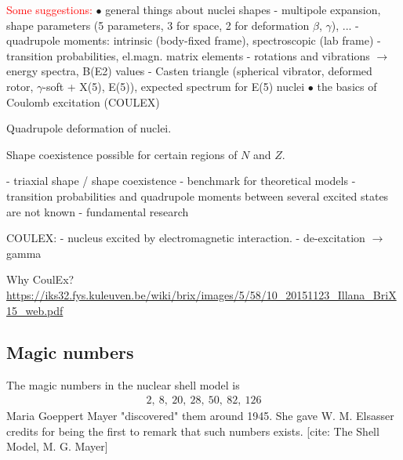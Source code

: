 \documentclass[twoside,english]{uiofysmaster/uiofysmaster}
\newcommand{\ga}{$\gamma$}
\begin{document}
\textcolor{red}{Some suggestions:} \newline
$\bullet$ general things about nuclei shapes \newline
- multipole expansion, shape parameters (5 parameters, 3 for space, 2 for deformation $\beta$, \ga), ... \newline
- quadrupole moments: intrinsic (body-fixed frame), spectroscopic (lab frame)  \newline
- transition probabilities, el.magn. matrix elements  \newline
- rotations and vibrations $\rightarrow$ energy spectra, B(E2) values  \newline
- Casten triangle (spherical vibrator, deformed rotor, \ga-soft + X(5), E(5)), expected spectrum for E(5) nuclei \newline
$\bullet$ the basics of Coulomb excitation (COULEX)

Quadrupole deformation of nuclei. \newline

Shape coexistence possible for certain regions of $N$ and $Z$.

\bigskip

- triaxial shape / shape coexistence \newline
- benchmark for theoretical models \newline
- transition probabilities and quadrupole moments between several excited states are not known \newline
- fundamental research

\bigskip

COULEX: \newline
- nucleus excited by electromagnetic interaction. \newline
- de-excitation $\rightarrow$ gamma

\bigskip

Why CoulEx? \url{https://iks32.fys.kuleuven.be/wiki/brix/images/5/58/10_20151123_Illana_BriX15_web.pdf} \newline

\bigskip

\subsection*{Magic numbers}
The magic numbers in the nuclear shell model is 
\begin{align}
	2, ~8, ~20, ~28, ~50, ~82, ~126
\end{align}
Maria Goeppert Mayer "discovered" them around 1945. She gave W. M. Elsasser credits for being the first to remark that such numbers exists. [cite: The Shell Model, M. G. Mayer]
\end{document}
